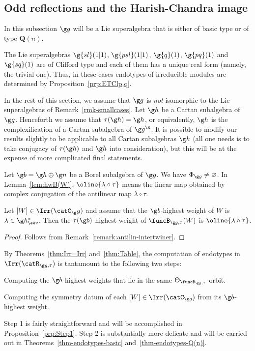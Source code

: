 \documentclass[12pt]{amsart}
\begin{document}
\subsection{Odd reflections and the Harish-Chandra image}
In this subsection $\g g$ will be a Lie superalgebra that is either of basic type or of type $\mathbf Q(n)$. 
\begin{rmk}
\label{rmk-smallcases}
The Lie superalgebras $\g{sl}(1|1)$, $\g{psl}(1|1)$, $\g{q}(1)$, $\g{pq}(1)$ and  $\g{sq}(1)$  are of Clifford type and each of them has a unique real form (namely, the trivial one). Thus, in these  cases endotypes of irreducible modules are determined by Proposition~\ref{prp:ETClp,q}.   
\end{rmk}
In the rest of this section, we assume that $\g g$ is \emph{not} isomorphic to the Lie superalgebras of Remark~\ref{rmk-smallcases}.  
Let $\g h$ be a Cartan subalgebra of $\g g$.
Henceforth we assume that  $\tau(\g h)=\g h$, or equivalently, $\g h$ is the complexification of a Cartan subalgebra of $\g g^\R$. It is possible to modify our results slightly to be applicable to all Cartan subalgebras $\g h$ (all one needs is to take conjugacy of $\tau(\g h)$ and $\g h$ into consideration), but this will be at the expense of more complicated final statements. 



Let 
$\g b=\g h\oplus\g n$ be a Borel subalgebra of $\g g$. We have $\Phi_{\g g}\neq \varnothing$. In Lemma~\ref{lem:hwB(W)}, $\oline{\lambda\circ\tau}$ means the linear map obtained by complex conjugation of the antilinear map $\lambda\circ\tau$.
\begin{lem}
\label{lem:hwB(W)}
Let $[W]\in\Irr(\catC_\g g)$ and assume that the $\g b$-highest weight of $W$ is $\lambda\in\g h_\eev^*$. Then the $\tau(\g b)$-highest weight of $\funcB_{\g g,\tau}(W)$ is $\oline {\lambda\circ\tau}$.
\end{lem}
\begin{proof}
Follows from Remark~\ref{remark:antilin-intertwiner}.\end{proof}



By Theorems~\ref{thm:Irr=Irr}
 and~\ref{thm:Table}, 
the computation  of endotypes in $\Irr(\catR_{\g g,\tau})$ is tantamount to the following two steps:
\medskip
\begin{description}\setlength\itemsep{.5em}
\item[Step 1] Computing the $\g b$-highest weights 
that lie in the same $\Theta_{\funcB_{\g g,\tau}}$-orbit.
\item[Step 2] Computing the symmetry datum of each $[W]\in \Irr(\catC_{\g g})$ from its $\g b$-highest weight. 
\end{description}
\medskip
Step 1 is fairly straightforward and will be accomplished in Proposition~\ref{prp:Step1}. Step 2 is substantially more delicate and will be carried out in 
Theorems~\ref{thm-endotypes-basic} and~\ref{thm-endotypes-Q(n)}. 
\end{document}
